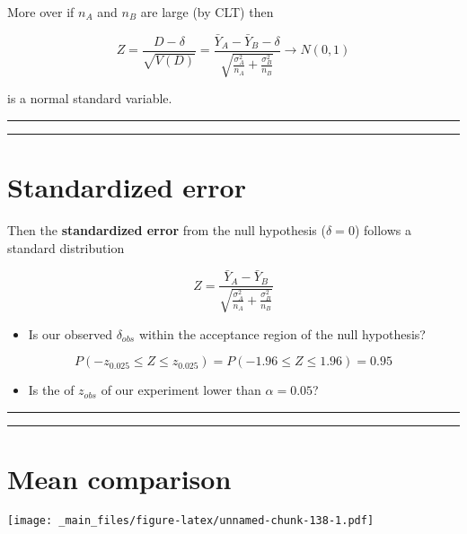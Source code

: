 \documentclass[
]{book}
\providecommand{\tightlist}{%
  \setlength{\itemsep}{0pt}\setlength{\parskip}{0pt}}
\begin{document}
More over if \(n_A\) and \(n_B\) are large (by CLT) then

\[Z=\frac{D-\delta}{\sqrt{V(D)}}=\frac{\bar{Y}_A-\bar{Y}_B -\delta}{\sqrt{\frac{\sigma^2_A}{n_A}+\frac{\sigma^2_B}{n_B}}} \rightarrow N(0,1)\]

is a normal standard variable.

\begin{center}\rule{0.5\linewidth}{0.5pt}\end{center}

\begin{center}\rule{0.5\linewidth}{0.5pt}\end{center}

\hypertarget{standardized-error}{%
\section{Standardized error}\label{standardized-error}}

Then the \textbf{standardized error} from the null hypothesis (\(\delta=0\)) follows a standard distribution

\[Z=\frac{\bar{Y}_A-\bar{Y}_B}{\sqrt{\frac{\sigma^2_A}{n_A}+\frac{\sigma^2_B}{n_B}}}\]

\begin{itemize}
\tightlist
\item
  Is our observed \(\delta_{obs}\) within the acceptance region of the null hypothesis?
\end{itemize}

\[P(-z_{0.025} \leq Z \leq z_{0.025})=P(-1.96 \leq Z \leq 1.96)=0.95\]

\begin{itemize}
\tightlist
\item
  Is the of \(z_{obs}\) of our experiment lower than \(\alpha=0.05\)?
\end{itemize}

\begin{center}\rule{0.5\linewidth}{0.5pt}\end{center}

\begin{center}\rule{0.5\linewidth}{0.5pt}\end{center}

\hypertarget{mean-comparison}{%
\section{Mean comparison}\label{mean-comparison}}

\texttt{[image: \_main\_files/figure-latex/unnamed-chunk-138-1.pdf]}
\end{document}
